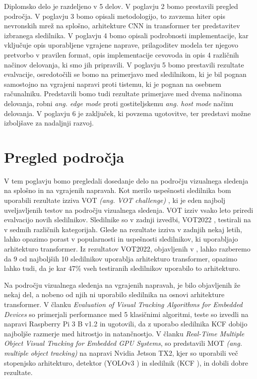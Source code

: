 \documentclass[a4paper,12pt,openright]{book}
\begin{document}
Diplomsko delo je razdeljeno v 5 delov. V poglavju 2 bomo prestavili pregled področja. V poglavju 3 bomo opisali metodologijo, to zavzema hiter opis nevronskih mrež na splošno, arhitekture CNN in transformer ter predstavitev izbranega sledilnika. V poglavju 4 bomo opisali podrobnosti implementacije, kar vključuje opis uporabljene vgrajene naprave, prilagoditev modela ter njegovo pretvorbo v pravilen format, opis implementacije cevovoda in opis 4 različnih načinov delovanja, ki smo jih pripravili. V poglavju 5 bomo prestavili rezultate evalvacije, osredotočili se bomo na primerjavo med sledilnikom, ki je bil pognan samostojno na vgrajeni napravi proti tistemu, ki je pognan na osebnem računalniku. Predstavili bomo tudi rezultate primerjave med dvema načinoma delovanja, robni \emph{ang. edge mode} proti gostiteljskemu \emph{ang. host mode} načinu delovanja. V poglavju 6 je zaključek, ki povzema ugotovitve, ter predstavi možne izboljšave za nadaljnji razvoj.

\chapter{Pregled področja}
\label{ch:0}
V tem poglavju bomo pregledali dosedanje delo na področju vizualnega sledenja na splošno in na vgrajenih napravah. Kot merilo uspešnosti sledilnika bom uporabili rezultate izziva VOT \emph{(ang. VOT challenge)} \cite{vot}, ki je eden najbolj uveljavljenih testov na področju vizualnega sledenja. VOT izziv vsako leto priredi evalvacijo novih sledilnikov. Sledilnike so v zadnji izvedbi, VOT2022 \cite{vot2022}, testirali na v sedmih različnih kategorijah. Glede na rezultate izziva v zadnjih nekaj letih, lahko opazimo porast v popularnosti in uspešnosti sledilnikov, ki uporabljajo arhitekturo transformer. Iz rezultatov VOT2022, objavljenih v \cite{vot2022}, lahko razberemo da 9 od najboljših 10 sledilnikov uporablja arhitekturo transformer, opazimo lahko tudi, da je kar 47\% vseh testiranih sledilnikov uporabilo to arhitekturo.

Na področju vizualnega sledenja na vgrajenih napravah, je bilo objavljenih že nekaj del, a nobeno od njih ni uporabilo sledilnika na osnovi arhitekture transformer. V članku \emph{Evaluation of Visual Tracking Algorithms for Embedded Devices}\cite{evaluation_of_visual_tracking_algorithms_for_embedded_devices} so primerjali performance med 5 klasičnimi algoritmi, teste so izvedli na napravi Raspberry Pi 3 B v1.2 in ugotovili, da z uporabo sledilnika KCF dobijo najboljše razmerje med hitrostjo in natančnostjo. V članku \emph{Real-Time Multiple Object Visual Tracking for Embedded GPU Systems}\cite{real_time_multiple_object_visual_tracking_for_embedded_gpu_systems}, so predstavili MOT \emph{(ang. multiple object tracking)} na napravi Nvidia Jetson TX2, kjer so uporabili več stopenjsko arhitekturo, detektor (YOLOv3 \cite{yolov3}) in sledilnik (KCF \cite{kcf}), in dobili dobre rezultate.
\end{document}
